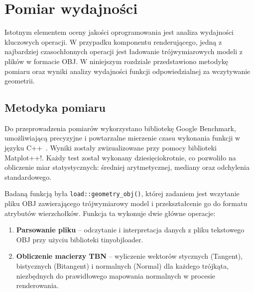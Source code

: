 \section{Pomiar wydajności}

Istotnym elementem oceny jakości oprogramowania jest analiza wydajności kluczowych operacji. W przypadku komponentu renderującego, jedną z najbardziej czasochłonnych operacji jest ładowanie trójwymiarowych modeli z plików w formacie OBJ. W niniejszym rozdziale przedstawiono metodykę pomiaru oraz wyniki analizy wydajności funkcji odpowiedzialnej za wczytywanie geometrii.

\subsection{Metodyka pomiaru}

Do przeprowadzenia pomiarów wykorzystano bibliotekę Google Benchmark, umożliwiającą precyzyjne i powtarzalne mierzenie czasu wykonania funkcji w języku C++~\cite{Google-benchmark}. Wyniki zostały zwizualizowane przy pomocy biblioteki Matplot++!\cite{matplotplusplus}. Każdy test został wykonany dziesięciokrotnie, co pozwoliło na obliczenie miar statystycznych: średniej arytmetycznej, mediany oraz odchylenia standardowego.

Badaną funkcją była \texttt{load::geometry\_obj()}, której zadaniem jest wczytanie pliku OBJ zawierającego trójwymiarowy model i przekształcenie go do formatu atrybutów wierzchołków. Funkcja ta wykonuje dwie główne operacje:
\begin{enumerate}
  \item \textbf{Parsowanie pliku} -- odczytanie i interpretacja danych z pliku tekstowego OBJ przy użyciu biblioteki tinyobjloader.
  \item \textbf{Obliczenie macierzy TBN} -- wyliczenie wektorów stycznych (Tangent), bistycznych (Bitangent) i normalnych (Normal) dla każdego trójkąta, niezbędnych do prawidłowego mapowania normalnych w procesie renderowania.
\end{enumerate}

